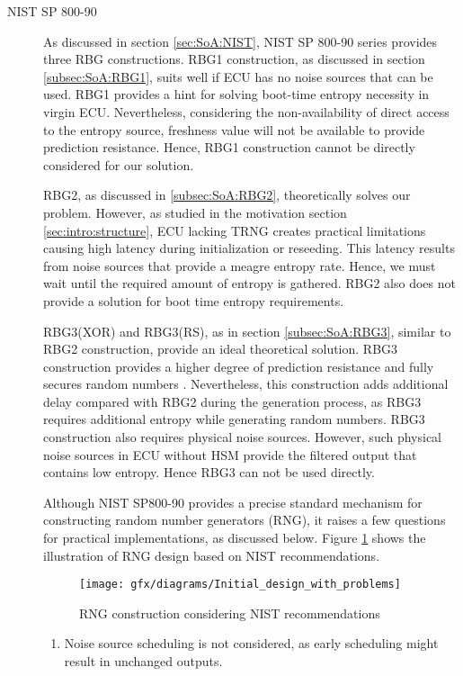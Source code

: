 \begin{description}
	\item[NIST SP 800-90] As discussed in section \ref{sec:SoA:NIST}, NIST SP 800-90 series provides three RBG constructions. RBG1 construction, as discussed in section \ref{subsec:SoA:RBG1}, suits well if ECU has no noise sources that can be used. RBG1 provides a hint for solving boot-time entropy necessity in virgin ECU. Nevertheless, considering the non-availability of direct access to the entropy source, freshness value will not be available to provide prediction resistance. Hence, RBG1 construction cannot be directly considered for our solution.
	
	RBG2, as discussed in \ref{subsec:SoA:RBG2}, theoretically solves our problem. However, as studied in the motivation section \ref{sec:intro:structure}, ECU lacking TRNG creates practical limitations causing high latency during initialization or reseeding. This latency results from noise sources that provide a meagre entropy rate. Hence, we must wait until the required amount of entropy is gathered. RBG2 also does not provide a solution for boot time entropy requirements.
	
	RBG3(XOR) and RBG3(RS), as in section \ref{subsec:SoA:RBG3}, similar to RBG2 construction, provide an ideal theoretical solution. RBG3 construction provides a higher degree of prediction resistance and fully secures random numbers \cite{SP90C-2022}. Nevertheless, this construction adds additional delay compared with RBG2 during the generation process, as RBG3 requires additional entropy while generating random numbers. RBG3 construction also requires physical noise sources. However, such physical noise sources in ECU without HSM provide the filtered output that contains low entropy. Hence RBG3 can not be used directly.
	
	Although NIST SP800-90 provides a precise standard mechanism for constructing random number generators (RNG), it raises a few questions for practical implementations, as discussed below. Figure \ref{fig:4:2} shows the illustration of RNG design based on NIST recommendations.
	
	\begin{figure}[!h]
		\centering
		\texttt{[image: gfx/diagrams/Initial\_design\_with\_problems]}
		\caption{RNG construction considering NIST recommendations}
		\label{fig:4:2}
	\end{figure}

	\begin{enumerate}	
		\item Noise source scheduling is not considered, as early scheduling might result in unchanged outputs.
		

\end{enumerate}
\end{description}
